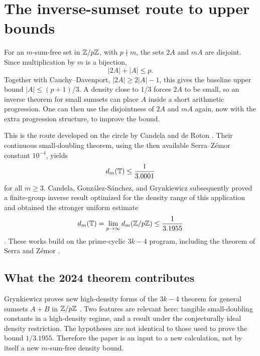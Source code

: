 \section{The inverse-sumset route to upper bounds}
\label{sec:inverse-sumset-route}

For an \(m\)-sum-free set in \(\mathbb Z/p\mathbb Z\), with \(p\nmid m\), the sets \(2A\) and
\(mA\) are disjoint.  Since multiplication by \(m\) is a bijection,
\[
    |2A|+|A|\leq p.
\]
Together with Cauchy--Davenport, \(|2A|\geq2|A|-1\), this gives the baseline
upper bound \(|A|\leq(p+1)/3\).  A density close to \(1/3\) forces \(2A\) to be
small, so an inverse theorem for small sumsets can place \(A\) inside a short
arithmetic progression.  One can then use the disjointness of \(2A\) and
\(mA\) again, now with the extra progression structure, to improve the bound.

This is the route developed on the circle by Candela and de Roton
\cite{CandelaDeRoton2019}.  Their continuous small-doubling theorem, using the
then available Serra--Z\'emor constant \(10^{-4}\), yields
\[
    d_m(\mathbb T)\leq \frac{1}{3.0001}
\]
for all \(m\geq3\).  Candela, Gonz\'alez-S\'anchez, and Grynkiewicz subsequently
proved a finite-group inverse result optimized for the density range of this
application and obtained the stronger uniform estimate
\[
    d_m(\mathbb T)
    =\lim_{p\to\infty}d_m(\mathbb Z/p\mathbb Z)
    \leq \frac1{3.1955}
\]
\cite[Theorem~1.5]{CandelaGonzalezSanchezGrynkiewicz2021}.  These works build on
the prime-cyclic \(3k-4\) program, including the theorem of Serra and Z\'emor
\cite{SerraZemor2009}.

\subsection{What the 2024 theorem contributes}

Grynkiewicz proves new high-density forms of the \(3k-4\) theorem for general
sumsets \(A+B\) in \(\mathbb Z/p\mathbb Z\) \cite{Grynkiewicz2024}.  Two features are relevant
here: tangible small-doubling constants in a high-density regime, and a result
under the conjecturally ideal density restriction.  The hypotheses are not
identical to those used to prove the bound \(1/3.1955\).  Therefore the paper is
an input to a new calculation, not by itself a new \(m\)-sum-free density
bound.

